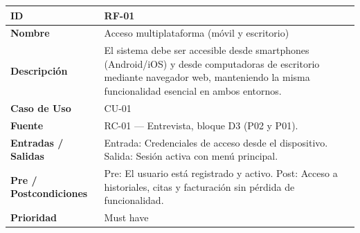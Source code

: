 \documentclass[
]{article}
\newcounter{none} %
\begin{document}
{\def\LTcaptype{none} %
\begin{longtable}[]{|
  >{\raggedright\arraybackslash}p{}|
  >{\raggedright\arraybackslash}p{}|}
\hline
\begin{minipage}[b]{\linewidth}\raggedright
\textbf{ID}
\end{minipage} & \begin{minipage}[b]{\linewidth}\raggedright
RF-01
\end{minipage} \\
\hline
\endhead
\hline
\endlastfoot
\textbf{Nombre} & \begin{minipage}[t]{\linewidth}\raggedright
Acceso multiplataforma (móvil y escritorio)
\end{minipage} \\
\hline
\textbf{Descripción} & \begin{minipage}[t]{\linewidth}\raggedright
El sistema debe ser accesible desde smartphones (Android/iOS) y desde computadoras de escritorio mediante navegador web, manteniendo la misma funcionalidad esencial en ambos entornos.
\end{minipage} \\
\hline
\textbf{Caso de Uso} & \begin{minipage}[t]{\linewidth}\raggedright
CU-01
\end{minipage} \\
\hline
\textbf{Fuente} & \begin{minipage}[t]{\linewidth}\raggedright
RC-01 — Entrevista, bloque D3 (P02 y P01).
\end{minipage} \\
\hline
\textbf{Entradas / Salidas} & \begin{minipage}[t]{\linewidth}\raggedright
Entrada: Credenciales de acceso desde el dispositivo. Salida: Sesión activa con menú principal.
\end{minipage} \\
\hline
\textbf{Pre / Postcondiciones} & \begin{minipage}[t]{\linewidth}\raggedright
Pre: El usuario está registrado y activo. Post: Acceso a historiales, citas y facturación sin pérdida de funcionalidad.
\end{minipage} \\
\hline
\textbf{Prioridad} & \begin{minipage}[t]{\linewidth}\raggedright
Must have
\end{minipage} \\

\end{longtable}}
\end{document}
